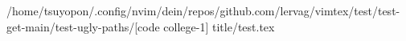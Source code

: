 /home/tsuyopon/.config/nvim/dein/repos/github.com/lervag/vimtex/test/test-get-main/test-ugly-paths/[code college-1] title/test.tex